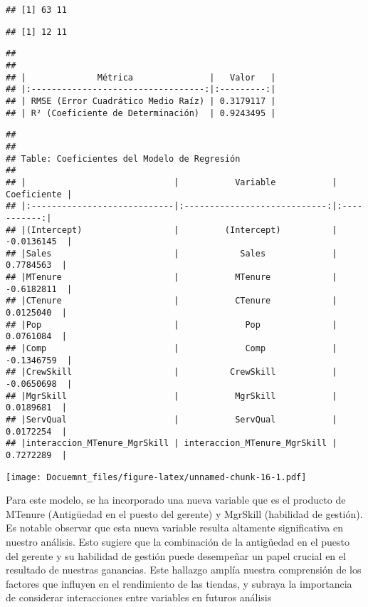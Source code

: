 \documentclass[
]{article}
\begin{document}
\begin{verbatim}
## [1] 63 11
\end{verbatim}

\begin{verbatim}
## [1] 12 11
\end{verbatim}

\begin{verbatim}
## 
## 
## |              Métrica               |   Valor   |
## |:----------------------------------:|:---------:|
## | RMSE (Error Cuadrático Medio Raíz) | 0.3179117 |
## | R² (Coeficiente de Determinación)  | 0.9243495 |
\end{verbatim}

\begin{verbatim}
## 
## 
## Table: Coeficientes del Modelo de Regresión
## 
## |                             |           Variable           | Coeficiente |
## |:----------------------------|:----------------------------:|:-----------:|
## |(Intercept)                  |         (Intercept)          | -0.0136145  |
## |Sales                        |            Sales             |  0.7784563  |
## |MTenure                      |           MTenure            | -0.6182811  |
## |CTenure                      |           CTenure            |  0.0125040  |
## |Pop                          |             Pop              |  0.0761084  |
## |Comp                         |             Comp             | -0.1346759  |
## |CrewSkill                    |          CrewSkill           | -0.0650698  |
## |MgrSkill                     |           MgrSkill           |  0.0189681  |
## |ServQual                     |           ServQual           |  0.0172254  |
## |interaccion_MTenure_MgrSkill | interaccion_MTenure_MgrSkill |  0.7272289  |
\end{verbatim}

\texttt{[image: Docuemnt\_files/figure-latex/unnamed-chunk-16-1.pdf]}

Para este modelo, se ha incorporado una nueva variable que es el
producto de MTenure (Antigüedad en el puesto del gerente) y MgrSkill
(habilidad de gestión). Es notable observar que esta nueva variable
resulta altamente significativa en nuestro análisis. Esto sugiere que la
combinación de la antigüedad en el puesto del gerente y su habilidad de
gestión puede desempeñar un papel crucial en el resultado de nuestras
ganancias. Este hallazgo amplía nuestra comprensión de los factores que
influyen en el rendimiento de las tiendas, y subraya la importancia de
considerar interacciones entre variables en futuros análisis
\end{document}
